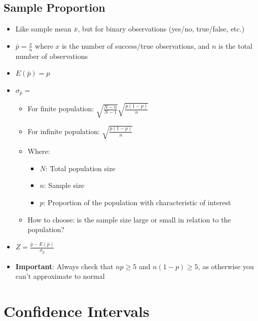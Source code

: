 \documentclass{article}
\begin{document}
\subsection{Sample Proportion}

\begin{itemize}
    \item Like sample mean $\bar{x}$, but for binary observations (yes/no, true/false, etc.)
    \item $\bar{p}=\frac{x}{n}$ where $x$ is the number of success/true observations, and $n$ is the total number of observations
    \item $E(\bar{p})=p$
    \item $\sigma_{\bar{p}}=$
    \begin{itemize}
        \item For finite population: $\sqrt{\frac{N-n}{N-1}}\sqrt{\frac{p(1-p)}{n}}$
        \item For infinite population: $\sqrt{\frac{p(1-p)}{n}}$
        \item Where:
        \begin{itemize}
            \item $N$: Total population size
            \item $n$: Sample size
            \item $p$: Proportion of the population with characteristic of interest
        \end{itemize}
        \item How to choose: is the sample size large or small in relation to the population?
    \end{itemize}
    \item $Z=\frac{\bar{p}-E(\bar{p})}{\sigma_{\bar{p}}}$
    \item \textbf{Important}: Always check that $np \geq 5$ and $n(1-p) \geq 5$, as otherwise you can't approximate to normal
\end{itemize}

\section{Confidence Intervals}
\end{document}
